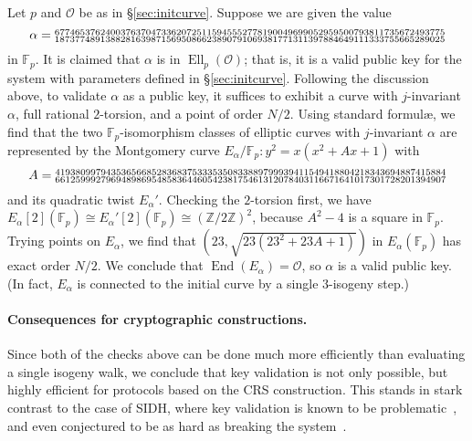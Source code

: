 \documentclass{llncs}
\newcommand{\F}{\mathbb{F}}
\newcommand{\Z}{\mathbb{Z}}
\renewcommand{\O}{\mathcal{O}}
\DeclareMathOperator{\End}{End}
\DeclareMathOperator{\Ell}{Ell}
\begin{document}
\begin{example}
    Let $p$ and $\O$ be as in \S\ref{sec:initcurve}.
    Suppose we are given the value
    \[
        \alpha = 
        \begin{subarray}{l}
            67746537624003763704733620725115945552778190049699052959500793811735672493775
            \\
            18737748913882816398715695086623890791069381771311397884649111333755665289025
        \end{subarray}
    \]
    in $\F_p$.  It is claimed that $\alpha$ is in $\Ell_p(\O)$;
    that is, it is a valid public key for the system with parameters
    defined in \S\ref{sec:initcurve}.
    Following the discussion above,
    to validate $\alpha$ as a public key,
    it suffices to exhibit a curve with $j$-invariant $\alpha$,
    full rational $2$-torsion,
    and a point of order $N/2$.
    Using standard formul\ae{},
    we find that the two $\F_p$-isomorphism classes of elliptic curves
    with $j$-invariant $\alpha$
    are represented by the Montgomery curve
    $E_\alpha/\F_p: y^2 = x(x^2 + Ax + 1)$
    with
    \[
        A = 
        \begin{subarray}{l}
            41938099794353656685283683753335350833889799939411549418804218343694887415884
            \\
            66125999279694898695485836446054238175461312078403116671641017301728201394907
        \end{subarray}
    \]
    and its quadratic twist $E_\alpha'$.
    Checking the $2$-torsion first,
    we have $E_\alpha[2](\F_p) \cong E_\alpha'[2](\F_p) \cong (\Z/2\Z)^2$,
    because $A^2 - 4$ is a square in $\F_p$.
    Trying points on $E_\alpha$,
    we find that $(23,\sqrt{23(23^2 + 23A + 1)})$ in $E_\alpha(\F_p)$
    has exact order $N/2$.
    We conclude that $\End(E_\alpha) = \O$,
    so $\alpha$ is a valid public key.
    (In fact, $E_\alpha$ is connected to the initial curve
    by a single $3$-isogeny step.)
\end{example}

\paragraph{Consequences for cryptographic constructions.}
Since both of the checks above can be done much more efficiently 
than evaluating a single isogeny walk, 
we conclude that key validation is not only possible,
but highly efficient for protocols based on the CRS construction. 
This stands in stark contrast to the case of SIDH,
where key validation is known to be
problematic~\cite{galbraithsecurity}, and even conjectured to be as
hard as breaking the system~\cite{cryptoeprint:2018:336}.
\end{document}
